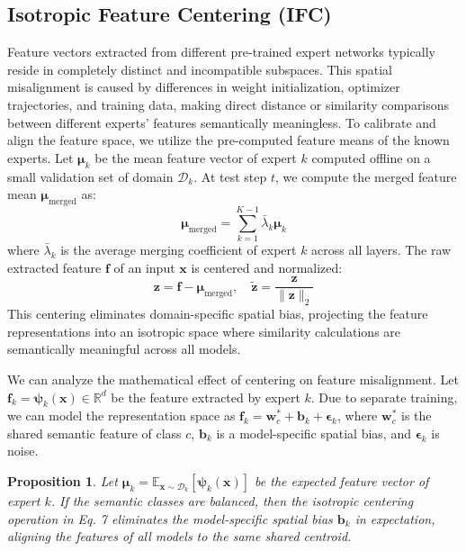 \documentclass{article}
\theoremstyle{plain}
\newtheorem{proposition}[theorem]{Proposition}
\theoremstyle{definition}
\theoremstyle{remark}
\begin{document}
\subsection{Isotropic Feature Centering (IFC)}
Feature vectors extracted from different pre-trained expert networks typically reside in completely distinct and incompatible subspaces. This spatial misalignment is caused by differences in weight initialization, optimizer trajectories, and training data, making direct distance or similarity comparisons between different experts' features semantically meaningless. To calibrate and align the feature space, we utilize the pre-computed feature means of the known experts. Let $\boldsymbol{\mu}_k$ be the mean feature vector of expert $k$ computed offline on a small validation set of domain $\mathcal{D}_k$. At test step $t$, we compute the merged feature mean $\boldsymbol{\mu}_{\text{merged}}$ as:
\begin{equation}
    \boldsymbol{\mu}_{\text{merged}} = \sum_{k=1}^{K-1} \bar{\lambda}_k \boldsymbol{\mu}_k
\end{equation}
where $\bar{\lambda}_k$ is the average merging coefficient of expert $k$ across all layers. The raw extracted feature $\mathbf{f}$ of an input $\mathbf{x}$ is centered and normalized:
\begin{equation}
    \mathbf{z} = \mathbf{f} - \boldsymbol{\mu}_{\text{merged}}, \quad \tilde{\mathbf{z}} = \frac{\mathbf{z}}{\|\mathbf{z}\|_2}
\end{equation}
This centering eliminates domain-specific spatial bias, projecting the feature representations into an isotropic space where similarity calculations are semantically meaningful across all models.

We can analyze the mathematical effect of centering on feature misalignment. Let $\mathbf{f}_k = \boldsymbol{\psi}_k(\mathbf{x}) \in \mathbb{R}^d$ be the feature extracted by expert $k$. Due to separate training, we can model the representation space as $\mathbf{f}_k = \mathbf{w}^*_c + \mathbf{b}_k + \boldsymbol{\epsilon}_k$, where $\mathbf{w}^*_c$ is the shared semantic feature of class $c$, $\mathbf{b}_k$ is a model-specific spatial bias, and $\boldsymbol{\epsilon}_k$ is noise.

\begin{proposition}
Let $\boldsymbol{\mu}_k = \mathbb{E}_{\mathbf{x} \sim \mathcal{D}_k}[\boldsymbol{\psi}_k(\mathbf{x})]$ be the expected feature vector of expert $k$. If the semantic classes are balanced, then the isotropic centering operation in Eq. 7 eliminates the model-specific spatial bias $\mathbf{b}_k$ in expectation, aligning the features of all models to the same shared centroid.
\end{proposition}
\end{document}
